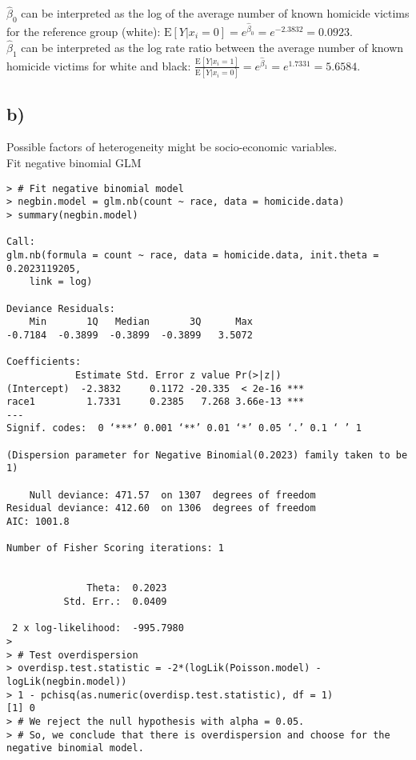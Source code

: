 \documentclass[a4paper]{article}
\newcommand{\E}{\mathrm{E}}
\begin{document}
$\widehat{\beta}_{0}$ can be interpreted as the log of the average number of known homicide victims for the reference group (white): $\E\left[Y|x_{i} = 0\right] = e^{\widehat{\beta}_{0}} = e^{-2.3832} = 0.0923$.\\

$\widehat{\beta}_{1}$ can be interpreted as the log rate ratio between the average number of known homicide victims for white and black: $\frac{\E\left[Y|x_{i} = 1\right]}{\E\left[Y|x_{i} = 0\right]} = e^{\widehat{\beta}_{1}} = e^{1.7331} = 5.6584$.\\


\vspace{\baselineskip}
\subsection{b)}
Possible factors of heterogeneity might be socio-economic variables.\\

Fit negative binomial GLM
\begin{lstlisting}
> # Fit negative binomial model 
> negbin.model = glm.nb(count ~ race, data = homicide.data)
> summary(negbin.model)

Call:
glm.nb(formula = count ~ race, data = homicide.data, init.theta = 0.2023119205, 
    link = log)

Deviance Residuals: 
    Min       1Q   Median       3Q      Max  
-0.7184  -0.3899  -0.3899  -0.3899   3.5072  

Coefficients:
            Estimate Std. Error z value Pr(>|z|)    
(Intercept)  -2.3832     0.1172 -20.335  < 2e-16 ***
race1         1.7331     0.2385   7.268 3.66e-13 ***
---
Signif. codes:  0 ‘***’ 0.001 ‘**’ 0.01 ‘*’ 0.05 ‘.’ 0.1 ‘ ’ 1

(Dispersion parameter for Negative Binomial(0.2023) family taken to be 1)

    Null deviance: 471.57  on 1307  degrees of freedom
Residual deviance: 412.60  on 1306  degrees of freedom
AIC: 1001.8

Number of Fisher Scoring iterations: 1


              Theta:  0.2023 
          Std. Err.:  0.0409 

 2 x log-likelihood:  -995.7980 
> 
> # Test overdispersion
> overdisp.test.statistic = -2*(logLik(Poisson.model) - logLik(negbin.model))
> 1 - pchisq(as.numeric(overdisp.test.statistic), df = 1)
[1] 0
> # We reject the null hypothesis with alpha = 0.05.
> # So, we conclude that there is overdispersion and choose for the negative binomial model.
\end{lstlisting}
\end{document}
